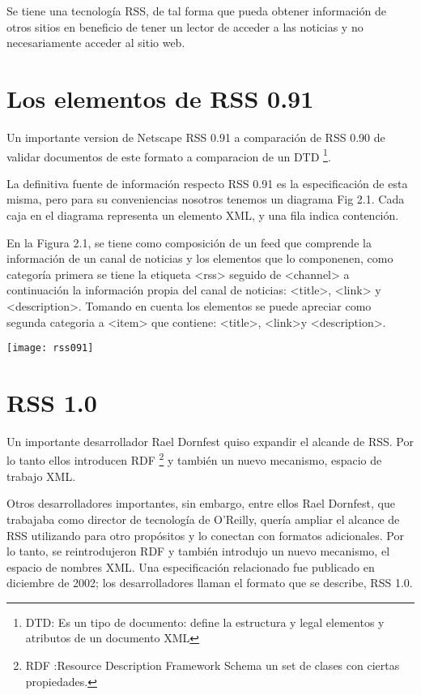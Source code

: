Se tiene una tecnolog\'{i}a RSS, de tal forma que pueda obtener informaci\'{o}n de otros sitios en beneficio de
tener un lector de acceder a las noticias y no necesariamente acceder al sitio web.

\section{Los elementos de RSS 0.91}

Un importante version de Netscape RSS 0.91 a comparaci\'{o}n de RSS 0.90 de validar documentos de este formato
a comparacion de un DTD \footnote{DTD: Es un tipo de documento: define la estructura y legal elementos y atributos de un documento
XML}. 

La definitiva fuente de informaci\'{o}n respecto RSS 0.91 es la especificación de esta misma, pero para su 
conveniencias nosotros tenemos un diagrama Fig 2.1. Cada caja en el diagrama representa un elemento XML, 
y una fila indica contenci\'{o}n.\cite{johnson2006rss}

En la Figura 2.1, se tiene como composici\'{o}n de un feed que comprende la informaci\'{o}n de un canal de noticias y los elementos
que lo componenen, como categor\'{i}a primera se tiene la etiqueta <rss> seguido de <channel> a continuaci\'{o}n la informaci\'{o}n 
propia del canal de noticias: <title>, <link> y <description>. Tomando en cuenta los elementos se puede apreciar como segunda 
categoria a <item> que contiene: <title>, <link>y <description>.   

\begin{minipage}{1.0\textwidth}
	\centering
	\texttt{[image: rss091]}

\end{minipage}


\section{RSS 1.0}

Un importante desarrollador Rael Dornfest quiso expandir el alcande de RSS. Por lo tanto ellos introducen
RDF \footnote{RDF :Resource Description Framework Schema un set de clases con ciertas propiedades.} y tambi\'{e}n un nuevo mecanismo, espacio de trabajo XML.

Otros desarrolladores importantes, sin embargo, entre ellos Rael Dornfest, que trabajaba como director de
tecnolog\'{i}a de O'Reilly, quer\'{i}a ampliar el alcance de RSS utilizando para otro prop\'{o}sitos y lo
conectan con formatos adicionales. Por lo tanto, se reintrodujeron RDF y tambi\'{e}n introdujo un nuevo
mecanismo, el espacio de nombres XML. Una especificaci\'{o}n relacionado fue publicado en diciembre de 2002;
los desarrolladores llaman el formato que se describe, RSS 1.0.\cite{johnson2006rss}

